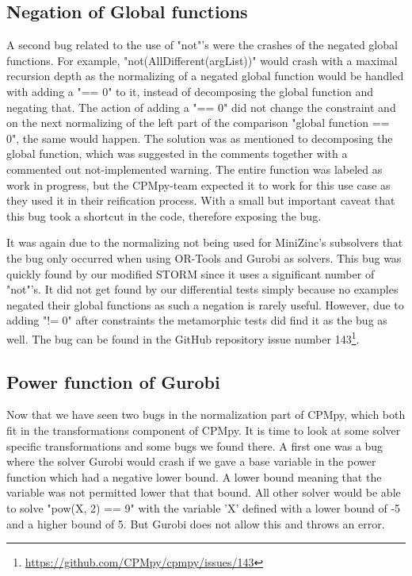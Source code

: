 \subsection{Negation of Global functions}
\label{res:bug:NegatedGlobal}
A second bug related to the use of "not"'s were the crashes of the negated global functions. For example, "not(AllDifferent(argList))" would crash with a maximal recursion depth as the normalizing of a negated global function would be handled with adding a "== 0" to it, instead of decomposing the global function and negating that. The action of adding a "== 0" did not change the constraint and on the next normalizing of the left part of the comparison "global function == 0", the same would happen. The solution was as mentioned to decomposing the global function, which was suggested in the comments together with a commented out not-implemented warning. The entire function was labeled as work in progress, but the CPMpy-team expected it to work for this use case as they used it in their reification process. With a small but important caveat that this bug took a shortcut in the code, therefore exposing the bug. 

It was again due to the normalizing not being used for MiniZinc's subsolvers that the bug only occurred when using OR-Tools and Gurobi as solvers. This bug was quickly found by our modified STORM since it uses a significant number of "not"'s. It did not get found by our differential tests simply because no examples negated their global functions as such a negation is rarely useful. However, due to adding "!= 0" after constraints the metamorphic tests did find it as the bug as well. The bug can be found in the GitHub repository issue number  143\footnote{\url{https://github.com/CPMpy/cpmpy/issues/143}}.

\subsection{Power function of Gurobi}
\label{res:bug:Power}
Now that we have seen two bugs in the normalization part of CPMpy, which both fit in the transformations component of CPMpy. It is time to look at some solver specific transformations and some bugs we found there. A first one was a bug where the solver Gurobi would crash if we gave a base variable in the power function which had a negative lower bound. A lower bound meaning that the variable was not permitted lower that that bound. All other solver would be able to solve "pow(X, 2) == 9" with the variable 'X' defined with a lower bound of -5 and a higher bound of 5. But Gurobi does not allow this and throws an error.

